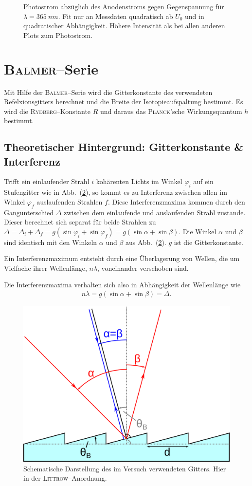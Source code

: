 \documentclass[sn-mathphys-num,iicol]{sn-jnl}
\theoremstyle{thmstyleone}
\theoremstyle{thmstyletwo}
\theoremstyle{thmstylethree}
\begin{document}
\begin{figure}[t]
        \centering
        \resizebox{.5\textwidth}{!}{}
        \caption{Photostrom abzüglich des Anodenstroms gegen Gegenspannung für $\lambda =\SI{365}{n m}$. Fit nur an Messdaten quadratisch ab $U_0$ und in quadratischer Abhängigkeit. Höhere Intensität als bei allen anderen Plots zum Photostrom.} \label{fig:photostrom_hohe_intensität}
\end{figure}

\section{\textsc{Balmer}--Serie}
Mit Hilfe der \textsc{Balmer}--Serie wird die Gitterkonstante des verwendeten Refelxionsgitters berechnet und die Breite der Isotopieaufspaltung bestimmt.
Es wird die \textsc{Rydberg}--Konstante $R$ und daraus das \textsc{Planck}'sche Wirkungsquantum $h$ bestimmt.

\subsection{Theoretischer Hintergrund: Gitterkonstante \& Interferenz}
Trifft ein einlaufender Strahl $i$ kohärenten Lichts im Winkel $\varphi _i$ auf ein Stufengitter wie in Abb.\ (\ref{fig:blazegitter}), so kommt es zu Interferenz zwischen allen im Winkel $\varphi _f$ auslaufenden Strahlen $f$.
Diese Interferenzmaxima kommen durch den Gangunterschied $\Delta $ zwischen dem einlaufende und auslaufenden Strahl zustande.
Dieser berechnet sich separat für beide Strahlen zu $\Delta =\Delta _i+\Delta _f=g\left(\sin \varphi _i+\sin \varphi _f\right)=g\left(\sin \alpha +\sin \beta \right)$.
Die Winkel $\alpha $ und $\beta $ sind identisch mit den Winkeln $\alpha $ und $\beta $ aus Abb.\ (\ref{fig:blazegitter}).
$g$ ist die Gitterkonstante.

Ein Interferenzmaximum entsteht durch eine Überlagerung von Wellen, die um Vielfache ihrer Wellenlänge, $n \lambda $, voneinander verschoben sind.

Die Interferenzmaxima verhalten sich also in Abhängigkeit der Wellenlänge wie
\begin{align} 
        n \lambda =g\left(\sin \alpha +\sin \beta \right)=\Delta 
.\end{align} 
\begin{figure}[t]
        \centering
        \includegraphics[width=.5\textwidth]{402_stufengitter.png}
        \caption{Schematische Darstellung des im Versuch verwendeten Gitters. Hier in der \textsc{Littrow}--Anordnung.\cite{WikipediaBlazegitter}} \label{fig:blazegitter}
\end{figure}
\end{document}
